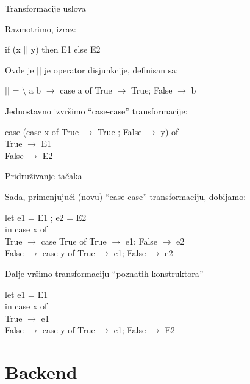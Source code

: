 \documentclass{beamer}
\begin{document}
\begin{frame}[fragile]{Transformacije uslova}

	Razmotrimo, izraz:
	\begin{block}{}
	if (x $ || $ y) then E1 else E2
	\end{block}

	Ovde je $ || $ je operator disjunkcije, definisan sa:
	\begin{block}{}
	$ || $ = $ \setminus $ a b $ \rightarrow $ case a of {True $ \rightarrow $ True; False $ \rightarrow $ b}
	\end{block}

	Jednostavno izvršimo “case-case” transformacije:
	\begin{block}{}
		case (case x of {True $ \rightarrow $ True ; False $ \rightarrow $ y}) of\\
		True $ \rightarrow $ E1\\
		False $ \rightarrow $ E2
	\end{block}
\end{frame}

\begin{frame}[fragile]{Pridruživanje tačaka}
		
		Sada, primenjujući (novu) “case-case” transformaciju, dobijamo:
		\begin{block}{}
			let e1 = E1 ; e2 = E2 \\
			in case x of \\
			True $ \rightarrow $ case True of {True $ \rightarrow $ e1; False $ \rightarrow $ e2} \\
			False $ \rightarrow $ case y of {True $ \rightarrow $ e1; False $ \rightarrow $ e2}
		\end{block}
		
		Dalje vršimo transformaciju “poznatih-konstruktora”
		\begin{block}{}
			let e1 = E1 \\
			in case x of \\
			True $ \rightarrow $ e1 \\
			False $ \rightarrow $ case y of {True $ \rightarrow $ e1; False $ \rightarrow $ E2}
		\end{block}
\end{frame}

\section{Backend}
\end{document}

